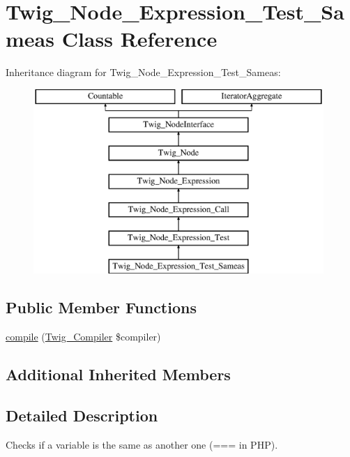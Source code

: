 \hypertarget{classTwig__Node__Expression__Test__Sameas}{}\section{Twig\+\_\+\+Node\+\_\+\+Expression\+\_\+\+Test\+\_\+\+Sameas Class Reference}
\label{classTwig__Node__Expression__Test__Sameas}
Inheritance diagram for Twig\+\_\+\+Node\+\_\+\+Expression\+\_\+\+Test\+\_\+\+Sameas\+:\begin{figure}[H]
\begin{center}
\leavevmode
\includegraphics[height=7.000000cm]{classTwig__Node__Expression__Test__Sameas}
\end{center}
\end{figure}
\subsection*{Public Member Functions}
\begin{DoxyCompactItemize}
\item 
\hyperlink{classTwig__Node__Expression__Test__Sameas_a860041620edef8b64757cda447f46a77}{compile} (\hyperlink{classTwig__Compiler}{Twig\+\_\+\+Compiler} \$compiler)
\end{DoxyCompactItemize}
\subsection*{Additional Inherited Members}


\subsection{Detailed Description}
Checks if a variable is the same as another one (=== in P\+HP).

